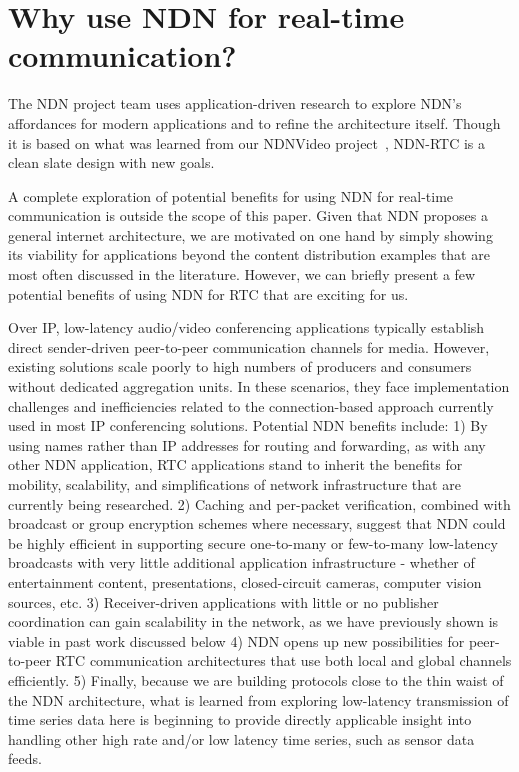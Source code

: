 \documentclass{icn/sig-alternate-2013} %
\newcommand{\ndnrtcName}{NDN-RTC} %
\begin{document}
\section{Why use NDN for real-time communication?}
\label{sec:why}

The NDN project team uses application-driven research to explore NDN's affordances for modern applications and to refine the architecture itself.  Though it is based on what was learned from our NDNVideo project~\cite{ndnvideo}, \ndnrtcName{} is a clean slate design with new goals.  

A complete exploration of potential benefits for using NDN for real-time communication is outside the scope of this paper. Given that NDN proposes a general internet architecture, we are motivated on one hand by simply showing its viability for applications beyond the content distribution examples that are most often discussed in the literature.  However, we can briefly present a few potential benefits of using NDN for RTC that are exciting for us. 

Over IP, low-latency audio/video conferencing applications typically establish direct sender-driven peer-to-peer communication channels for media. However,  existing solutions scale poorly to high numbers of producers and consumers without dedicated aggregation units. In these scenarios, they face implementation challenges and inefficiencies related to the connection-based approach currently used in most IP conferencing solutions.  Potential NDN benefits include: 1) By using names rather than IP addresses for routing and forwarding, as with any other NDN application, RTC applications stand to inherit the benefits for mobility, scalability, and simplifications of network infrastructure that are currently being researched.  2) Caching and per-packet verification, combined with broadcast or group encryption schemes where necessary, suggest that NDN could be highly efficient in supporting secure one-to-many or few-to-many low-latency broadcasts with very little additional application infrastructure - whether of entertainment content, presentations, closed-circuit cameras, computer vision sources, etc.  3) Receiver-driven applications with little or no publisher coordination can gain scalability in the network, as we have previously shown is viable in past work discussed below 4)  NDN opens up new possibilities for peer-to-peer RTC communication architectures that use both local and global channels efficiently.  5) Finally, because we are building protocols close to the thin waist of the NDN architecture, what is learned from exploring low-latency transmission of time series data here is beginning to provide directly applicable insight into handling other high rate  and/or low latency time series, such as sensor data feeds.  
\end{document}

